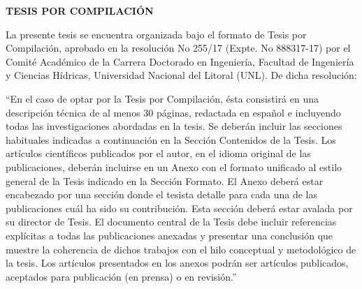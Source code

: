 \newpage
\thispagestyle{empty}
\vspace*{3em}
{\hfill\large \textbf{TESIS POR COMPILACIÓN}\hfill\mbox{}}
\vspace{1em}

La presente tesis se encuentra organizada bajo el formato de Tesis por Compilación, aprobado en la resolución No 255/17 (Expte. No 888317-17) por el Comité
Académico de la Carrera Doctorado en Ingeniería, Facultad de Ingeniería y Ciencias Hídricas, Universidad Nacional del Litoral (UNL). De dicha resolución:

``En el caso de optar por la Tesis por Compilación, ésta consistirá en una descripción técnica de al menos 30 páginas, redactada en español e incluyendo todas
las investigaciones abordadas en la tesis. Se deberán incluir las secciones habituales indicadas a continuación en la Sección Contenidos de la Tesis. Los
artículos científicos publicados por el autor, en el idioma original de las publicaciones, deberán incluirse en un Anexo con el formato unificado al estilo
general de la Tesis indicado en la Sección Formato. El Anexo deberá estar encabezado por una sección donde el tesista detalle para cada una de las publicaciones
cuál ha sido su contribución. Esta sección deberá estar avalada por su director de Tesis. El documento central de la Tesis debe incluir referencias explícitas a
todas las publicaciones anexadas y presentar una conclusión que muestre la coherencia de dichos trabajos con el hilo conceptual y metodológico de la tesis. Los
artículos presentados en los anexos podrán ser artículos publicados, aceptados para publicación (en prensa) o en revisión.''
